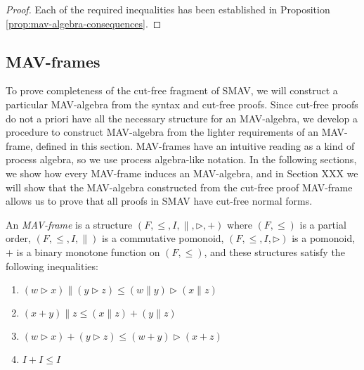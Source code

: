 \begin{proof}
  Each of the required inequalities has been established in
  Proposition \ref{prop:mav-algebra-consequences}.
\end{proof}

\subsection{MAV-frames}

To prove completeness of the cut-free fragment of SMAV, we will
construct a particular MAV-algebra from the syntax and cut-free
proofs. Since cut-free proofs do not a priori have all the necessary
structure for an MAV-algebra, we develop a procedure to construct
MAV-algebra from the lighter requirements of an MAV-frame, defined in
this section. MAV-frames have an intuitive reading as a kind of
process algebra, so we use process algebra-like notation. In the
following sections, we show how every MAV-frame induces an
MAV-algebra, and in Section XXX we will show that the MAV-algebra
constructed from the cut-free proof MAV-frame allows us to prove that
all proofs in SMAV have cut-free normal forms.

\begin{definition}
  An \emph{MAV-frame} is a structure
  $(F, \leq, I, \parallel, \rhd, +)$ where $(F, \leq)$ is a partial
  order, $(F, \leq, I, \parallel)$ is a commutative pomonoid,
  $(F, \leq, I, \rhd)$ is a pomonoid, $+$ is a binary monotone
  function on $(F, \leq)$, and these structures satisfy the following
  inequalities:
  \begin{enumerate}
  \item $(w \rhd x) \parallel (y \rhd z) \leq (w \parallel y) \rhd (x \parallel z)$
  \item $(x + y) \parallel z \leq (x \parallel z) + (y \parallel z)$
  \item $(w \rhd x) + (y \rhd z) \leq (w + y) \rhd (x + z)$
  \item $I + I \leq I$
  \end{enumerate}
\end{definition}

\begin{remark}
\end{remark}


